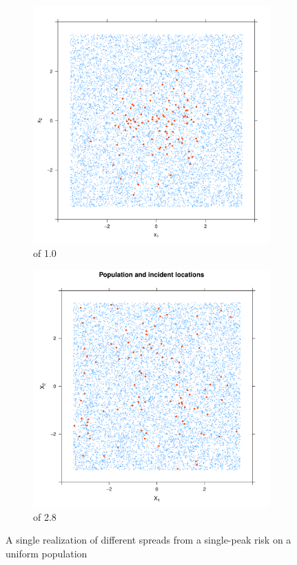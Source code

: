 \begin{figure}[htbp]
    \centering
    \begin{subfigure}{0.45\textwidth}
    \includegraphics[width=\textwidth]{results/unif_100_1.0_1h/output/population_and_incidents_scatter}
    \caption{ of 1.0}
    \end{subfigure}
    \begin{subfigure}{0.45\textwidth}
    \includegraphics[width=\textwidth]{results/unif_100_2.8_1h/output/population_and_incidents_scatter}
    \caption{ of 2.8}
    \end{subfigure}
    \caption{A single realization of different \glspl{spread} from a single-peak risk on a uniform population}
    \label{fig:one_sample:unif_Spreads_1h}
\end{figure}

